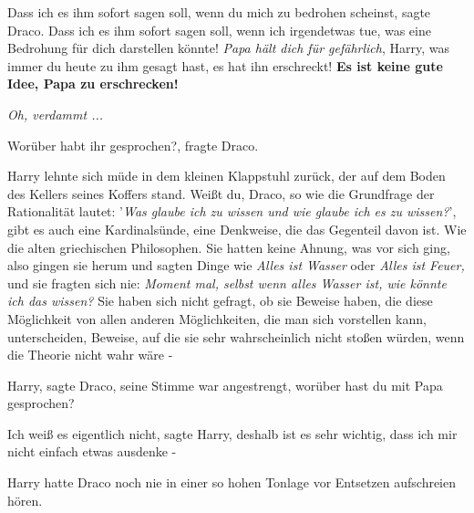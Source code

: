 \glqq{}Dass ich es ihm sofort sagen soll, wenn du mich zu bedrohen
scheinst\grqq{}, sagte Draco. \glqq{}Dass ich es ihm sofort sagen soll, wenn ich
irgendetwas tue, was eine Bedrohung für dich darstellen könnte! \emph{Papa hält
dich für gefährlich}, Harry, was immer du heute zu ihm gesagt hast, es hat ihn
erschreckt! \textbf{Es ist keine gute Idee, Papa zu erschrecken!}\grqq{}

\emph{Oh, verdammt ...}

\glqq{}Worüber habt ihr gesprochen?\grqq{}, fragte Draco.

Harry lehnte sich müde in dem kleinen Klappstuhl zurück, der auf dem Boden des
Kellers seines Koffers stand. \glqq{}Weißt du, Draco, so wie die Grundfrage der
Rationalität lautet: '\emph{Was glaube ich zu wissen und wie glaube ich es zu
wissen?}', gibt es auch eine Kardinalsünde, eine Denkweise, die das Gegenteil
davon ist. Wie die alten griechischen Philosophen. Sie hatten keine Ahnung, was
vor sich ging, also gingen sie herum und sagten Dinge wie \emph{\glqq{}Alles ist
Wasser\grqq{}} oder \emph{\glqq{}Alles ist Feuer\grqq{},} und sie fragten sich
nie:\emph{ \glqq{}Moment mal, selbst wenn alles Wasser ist, wie könnte ich das
wissen?} Sie haben sich nicht gefragt, ob sie Beweise haben, die diese
Möglichkeit von allen anderen Möglichkeiten, die man sich vorstellen kann,
unterscheiden, Beweise, auf die sie sehr wahrscheinlich nicht stoßen würden,
wenn die Theorie nicht wahr wäre -\grqq{}

\glqq{}Harry\grqq{}, sagte Draco, seine Stimme war angestrengt, \glqq{}worüber
hast du mit Papa gesprochen?\grqq{}

\glqq{}Ich weiß es eigentlich nicht\grqq{}, sagte Harry, \glqq{}deshalb ist es
sehr wichtig, dass ich mir nicht einfach etwas ausdenke -\grqq{}

Harry hatte Draco noch nie in einer so hohen Tonlage vor Entsetzen aufschreien
hören.


